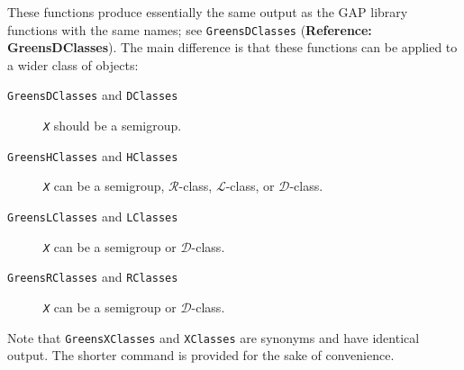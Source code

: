 \documentclass[a4paper,11pt]{report}
\begin{document}
{{{ These functions produce essentially the same output as the \textsf{GAP} library functions with the same names; see \texttt{GreensDClasses} (\textbf{Reference: GreensDClasses}). The main difference is that these functions can be applied to a wider class
of objects: 
\begin{description}
\item[{\texttt{GreensDClasses} and \texttt{DClasses}}]  \mbox{\texttt{\mdseries\slshape X}} should be a semigroup. 
\item[{\texttt{GreensHClasses} and \texttt{HClasses}}]  \mbox{\texttt{\mdseries\slshape X}} can be a semigroup, $\mathcal{R}$-class, $\mathcal{L}$-class, or $\mathcal{D}$-class. 
\item[{\texttt{GreensLClasses} and \texttt{LClasses}}]  \mbox{\texttt{\mdseries\slshape X}} can be a semigroup or $\mathcal{D}$-class. 
\item[{\texttt{GreensRClasses} and \texttt{RClasses}}]  \mbox{\texttt{\mdseries\slshape X}} can be a semigroup or $\mathcal{D}$-class. 
\end{description}
 Note that \texttt{GreensXClasses} and \texttt{XClasses} are synonyms and have identical output. The shorter command is provided for
the sake of convenience.

}}}
\end{document}
